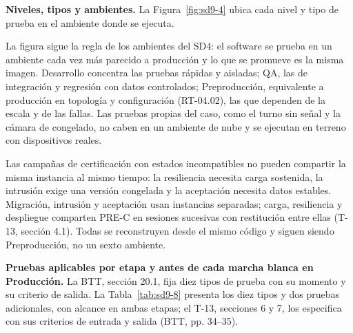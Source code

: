 \textbf{Niveles, tipos y ambientes.} La Figura~\ref{fig:sd9-4} ubica cada nivel y tipo de prueba en el ambiente donde se ejecuta.


La figura sigue la regla de los ambientes del SD4: el software se prueba en un ambiente cada vez más parecido a producción y lo que se promueve es la misma imagen. Desarrollo concentra las pruebas rápidas y aisladas; QA, las de integración y regresión con datos controlados; Preproducción, equivalente a producción en topología y configuración (RT-04.02), las que dependen de la escala y de las fallas. Las pruebas propias del caso, como el turno sin señal y la cámara de congelado, no caben en un ambiente de nube y se ejecutan en terreno con dispositivos reales.

Las campañas de certificación con estados incompatibles no pueden compartir la misma instancia al mismo tiempo: la resiliencia necesita carga sostenida, la intrusión exige una versión congelada y la aceptación necesita datos estables. Migración, intrusión y aceptación usan instancias separadas; carga, resiliencia y despliegue comparten PRE-C en sesiones sucesivas con restitución entre ellas (T-13, sección 4.1). Todas se reconstruyen desde el mismo código y siguen siendo Preproducción, no un sexto ambiente.

\textbf{Pruebas aplicables por etapa y antes de cada marcha blanca en Producción.} La BTT, sección 20.1, fija diez tipos de prueba con su momento y su criterio de salida. La Tabla~\ref{tab:sd9-8} presenta los diez tipos y dos pruebas adicionales, con alcance en ambas etapas; el T-13, secciones 6 y 7, los especifica con sus criterios de entrada y salida (BTT, pp. 34--35).

